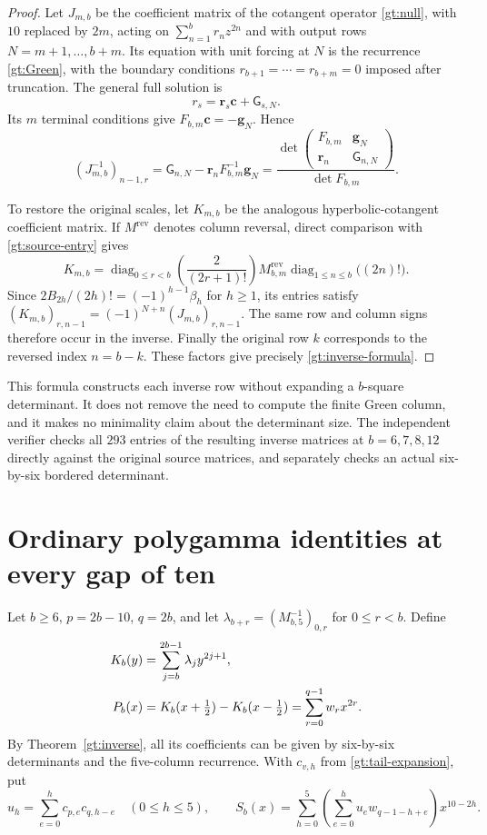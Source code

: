 \begin{proof}
Let $J_{m,b}$ be the coefficient matrix of the cotangent operator
\eqref{gt:null}, with $10$ replaced by $2m$, acting on
$\sum_{n=1}^b r_nz^{2n}$ and with output rows
$N=m+1,\ldots,b+m$. Its equation with unit forcing at $N$ is
the recurrence \eqref{gt:Green}, with the boundary conditions
$r_{b+1}=\cdots=r_{b+m}=0$ imposed after truncation.
The general full solution is
\[
          r_s=\mathbf r_s\mathbf c+\mathsf G_{s,N}.
\]
Its $m$ terminal conditions give
$F_{b,m}\mathbf c=-\mathbf g_N$. Hence
\[
 (J_{m,b}^{-1})_{n-1,r}
 =\mathsf G_{n,N}-\mathbf r_nF_{b,m}^{-1}\mathbf g_N
 =\frac{\det\begin{pmatrix}F_{b,m}&\mathbf g_N\\
                  \mathbf r_n&\mathsf G_{n,N}\end{pmatrix}}
        {\det F_{b,m}}.
\]

To restore the original scales, let $K_{m,b}$ be the analogous
hyperbolic-cotangent coefficient matrix. If $M^{\mathrm{rev}}$
denotes column reversal, direct comparison with
\eqref{gt:source-entry} gives
\[
 K_{m,b}=\operatorname{diag}_{0\le r<b}
           \left(\frac2{(2r+1)!}\right)
         M_{b,m}^{\mathrm{rev}}
         \operatorname{diag}_{1\le n\le b}\bigl((2n)!\bigr).
\]
Since $2B_{2h}/(2h)!=(-1)^{h-1}\beta_h$ for $h\ge1$,
its entries satisfy
$(K_{m,b})_{r,n-1}=(-1)^{N+n}(J_{m,b})_{r,n-1}$.
The same row and column signs therefore occur in the inverse.
Finally the original row $k$ corresponds to the reversed index
$n=b-k$. These factors give precisely \eqref{gt:inverse-formula}.
\end{proof}

This formula constructs each inverse row without expanding a
$b$-square determinant. It does not remove the need to compute the
finite Green column, and it makes no minimality claim about the
determinant size. The independent verifier checks all $293$ entries
of the resulting inverse matrices at $b=6,7,8,12$ directly against
the original source matrices, and separately checks an actual
six-by-six bordered determinant.

\section{Ordinary polygamma identities at every gap of ten}
\label{gt:identities}

Let $b\ge6$, $p=2b-10$, $q=2b$, and let
$\lambda_{b+r}=(M_{b,5}^{-1})_{0,r}$ for $0\le r<b$.
Define
\begin{align}
 K_b(y)&=\sum_{j=b}^{2b-1}\lambda_jy^{2j+1},\notag\\
 P_b(x)&=K_b(x+\tfrac12)-K_b(x-\tfrac12)
                   =\sum_{r=0}^{q-1}w_rx^{2r}.\label{gt:P}
\end{align}
By Theorem~\ref{gt:inverse}, all its coefficients can be given by
six-by-six determinants and the five-column recurrence.
With $c_{v,h}$ from \eqref{gt:tail-expansion}, put
\[
 u_h=\sum_{e=0}^{h}c_{p,e}c_{q,h-e}\quad(0\le h\le5),
 \qquad
 S_b(x)=\sum_{h=0}^{5}
       \left(\sum_{e=0}^{h}u_e w_{q-1-h+e}\right)x^{10-2h}.
\]

